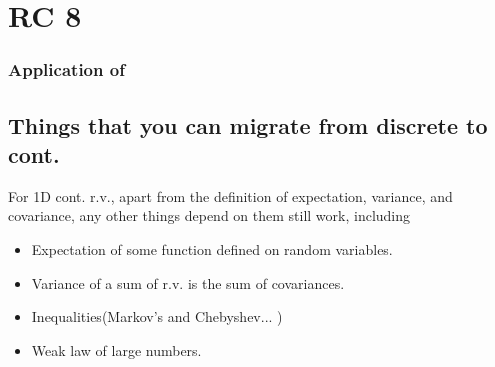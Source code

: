 \chapter{RC 8}

\subsection*{Application of }


\section*{Things that you can migrate from discrete to cont.}
For 1D cont. r.v., apart from the definition of expectation, variance, and covariance, any other things depend on them still work, including
\begin{itemize}
    \item Expectation of some function defined on random variables. 
    \item Variance of a sum of r.v. is the sum of covariances. 
    \item Inequalities(Markov's and Chebyshev... )
    \item Weak law of large numbers.
\end{itemize}
 

